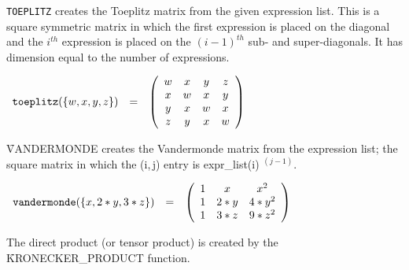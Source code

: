 {\tt TOEPLITZ} creates the Toeplitz matrix from the
given expression list.  This is a square symmetric matrix in which the
first expression is placed on the diagonal  and the $i^{th}$
expression is placed on the $(i-1)^{th}$ sub- and super-diagonals.
It has dimension equal to the number of expressions.

\begin{flushleft}  
\begin{math}  
\begin{array}{ccc}
{\tt toeplitz}(\{w,x,y,z\}) & = & 
        \left( \begin{array}{cccc} w & x & y & z \\ x & w & x & y \\
      y & x & w & x \\ z & y & x & w
 \end{array} \right) 
\end{array}
\end{math}  
\end{flushleft}

\f{VANDERMONDE} creates the Vandermonde matrix
from the expression list; the square matrix in which the (i,$\,$j)
entry is expr\_list(i) $^{(j-1)}$.

\begin{flushleft}  
\hspace*{0.1in}
\begin{math}  
\begin{array}{ccc}
{\tt vandermonde}(\{x,2*y,3*z\}) & = & 
        \left( \begin{array}{ccc} 1 & x & x^2 \\ 1 & 2*y & 4*y^2 \\ 1 
& 3*z & 9*z^2 
 \end{array} \right) 
\end{array}
\end{math}  
\end{flushleft}

The direct product (or tensor
product) is created by the
\f{KRONECKER\_PRODUCT} function.


